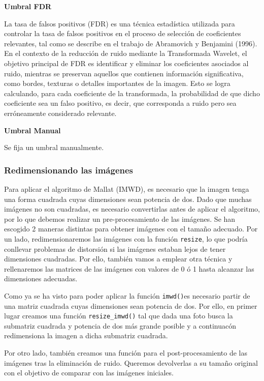 \documentclass[
]{article}
\begin{document}
\textbf{Umbral FDR}

La tasa de falsos positivos (FDR) es una técnica estadística utilizada
para controlar la tasa de falsos positivos en el proceso de selección de
coeficientes relevantes, tal como se describe en el trabajo de
Abramovich y Benjamini (1996). En el contexto de la reducción de ruido
mediante la Transformada Wavelet, el objetivo principal de FDR es
identificar y eliminar los coeficientes asociados al ruido, mientras se
preservan aquellos que contienen información significativa, como bordes,
texturas o detalles importantes de la imagen. Esto se logra calculando,
para cada coeficiente de la transformada, la probabilidad de que dicho
coeficiente sea un falso positivo, es decir, que corresponda a ruido
pero sea erróneamente considerado relevante.

\textbf{Umbral Manual}

Se fija un umbral manualmente.

\subsubsection{Redimensionando las
imágenes}\label{redimensionando-las-imuxe1genes}

Para aplicar el algoritmo de Mallat (IMWD), es necesario que la imagen
tenga una forma cuadrada cuyas dimensiones sean potencia de dos. Dado
que muchas imágenes no son cuadradas, es necesario convertirlas antes de
aplicar el algoritmo, por lo que debemos realizar un pre-procesamiento
de las imágenes. Se han escogido 2 maneras distintas para obtener
imágenes con el tamaño adecuado. Por un lado, redimensionaremos las
imágenes con la función \texttt{resize}, lo que podría conllevar
problemas de distorsión si las imágenes estaban lejos de tener
dimensiones cuadradas. Por ello, también vamos a emplear otra técnica y
rellenaremos las matrices de las imágenes con valores de 0 ó 1 hasta
alcanzar las dimensiones adecuadas.

Como ya se ha visto para poder aplicar la función \texttt{imwd()}es
necesario partir de una matriz cuadrada cuyas dimensiones sean potencia
de dos. Por ello, en primer lugar creamos una función
\texttt{resize\_imwd()} tal que dada una foto busca la submatriz
cuadrada y potencia de dos más grande posible y a continuacón
redimensiona la imagen a dicha submatriz cuadrada.

Por otro lado, también creamos una función para el post-procesamiento de
las imágenes tras la eliminación de ruido. Queremos devolverlas a su
tamaño original con el objetivo de comparar con las imágenes iniciales.
\end{document}
